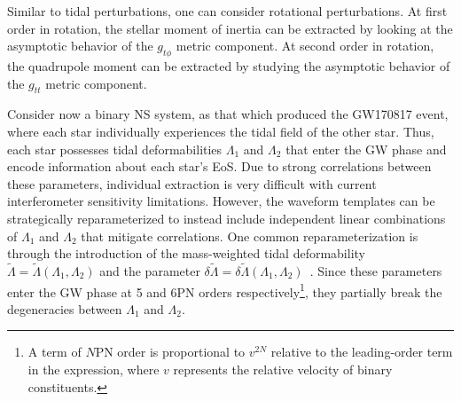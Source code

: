 \documentclass[prd,twocolumn,nofootinbib,superscriptaddress,amsmath,amssymb]{revtex4-1}
\begin{document}
Similar to tidal perturbations, one can consider rotational perturbations. At first order in rotation, the stellar moment of inertia can be extracted by looking at the asymptotic behavior of the $g_{t \phi}$ metric component. At second order in rotation, the quadrupole moment can be extracted by studying the asymptotic behavior of the $g_{t t}$ metric component. 

Consider now a binary NS system, as that which produced the GW170817 event, where each star individually experiences the tidal field of the other star.
Thus, each star possesses tidal deformabilities $\Lambda_1$ and $\Lambda_2$ that enter the GW phase and encode information about each star's EoS.
Due to strong correlations between these parameters, individual extraction is very difficult with current interferometer sensitivity limitations.
However, the waveform templates can be strategically reparameterized to instead include independent linear combinations of $\Lambda_1$ and $\Lambda_2$ that mitigate correlations. One common reparameterization is through the introduction of the mass-weighted tidal deformability $\tilde{\Lambda}=\tilde{\Lambda}(\Lambda_1,\Lambda_2)$ and the parameter $\delta \tilde{\Lambda}=\delta \tilde{\Lambda}(\Lambda_1,\Lambda_2)$~\cite{Favata:2013rwa,Wade:tidalCorrections}. Since these parameters enter the GW phase at 5 and 6PN orders respectively\footnote{A term of $N$PN order is proportional to $v^{2N}$ relative to the leading-order term in the expression, where $v$ represents the relative velocity of binary constituents.}, they partially break the degeneracies between $\Lambda_{1}$ and $\Lambda_{2}$.
\end{document}

